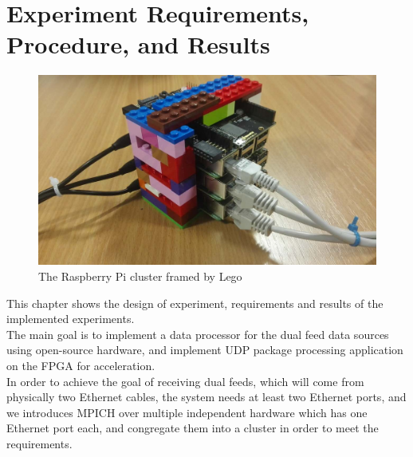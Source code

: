 \documentclass[11pt,openright,a4paper]{report}
\begin{document}
\chapter{Experiment Requirements, Procedure, and Results}
\begin{figure}[H]
	\centering
	\includegraphics[width=0.7\linewidth]{picture/photo/cluster}
	\caption{The Raspberry Pi cluster framed by Lego}
	\label{fig:cluster}
\end{figure}
This chapter shows the design of experiment, requirements and results of the implemented experiments.\\
The main goal is to implement a data processor for the dual feed data sources using open-source hardware, and implement UDP package processing application on the FPGA for acceleration.\\
In order to achieve the goal of receiving dual feeds, which will come from physically two Ethernet cables, the system needs at least two Ethernet ports, and we introduces MPICH over multiple independent hardware which has one Ethernet port each, and congregate them into a cluster in order to meet the requirements.\\
\newpage
\end{document}
